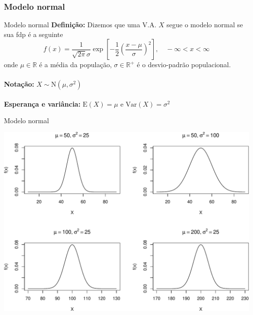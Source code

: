 \documentclass[10pt]{beamer}\usepackage[]{graphicx}\usepackage[]{color}
\newenvironment{knitrout}{}{} %
\providecommand{\E}{\text{E}}
\providecommand{\Var}{\text{Var}}
\providecommand{\N}{\text{N}}
\theoremstyle{definition}
\begin{document}
\subsubsection{Modelo normal}

\begin{frame}[fragile]{Modelo normal}
  \textbf{Definição:} Dizemos que uma V.A. $X$ segue o modelo
  normal se sua fdp é a seguinte
  \begin{equation*}
    f(x) = \frac{1}{\sqrt{2\pi}\sigma} \exp\left[-\frac{1}{2} \left( \frac{x -
          \mu}{\sigma}\right)^2\right], \quad -\infty < x < \infty
  \end{equation*}
  onde $\mu \in \mathbb{R}$ é a média da população, $\sigma \in
  \mathbb{R}^+$ é o desvio-padrão populacional. \\~\\
  \textbf{Notação:} $X \sim \N(\mu, \sigma^2)$ \\~\\
  \textbf{Esperança e variância:} $\E(X) = \mu$ e $\Var(X) = \sigma^2$
\end{frame}

\begin{frame}[fragile]{Modelo normal}
\begin{knitrout}\footnotesize
{}\color{fgcolor}

{\centering \includegraphics[width=1\textwidth]{figure/unnamed-chunk-5-1} 

}



\end{knitrout}
\end{frame}
\end{document}

